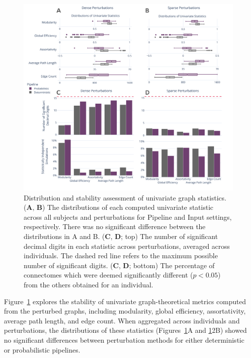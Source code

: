 \documentclass[fleqn,10pt]{SelfArx} %
\begin{document}
\begin{figure}[ht]\centering
\includegraphics[width=\linewidth]{figures/figS2_univariate_differences.pdf}
\caption{Distribution and stability assessment of univariate graph statistics. (\textbf{A}, \textbf{B}) The
distributions of each computed univariate statistic across all subjects and perturbations for Pipeline and Input
settings, respectively. There was no significant difference between the distributions in A and B. (\textbf{C},
\textbf{D}; top) The number of significant decimal digits in each statistic across perturbations, averaged across
individuals. The dashed red line refers to the maximum possible number of significant digits.
(\textbf{C}, \textbf{D}; bottom) The percentage of connectomes which were deemed significantly different
($p < 0.05$) from the others obtained for an individual.}
\label{sfig:univariate}
\end{figure}

Figure~\ref{sfig:univariate} explores the stability of univariate graph-theoretical metrics computed from the perturbed
graphs, including modularity, global efficiency, assortativity, average path length, and edge count. When aggregated
across individuals and perturbations, the distributions of these statistics (Figures~\ref{sfig:univariate}A and
\ref{sfig:univariate}2B) showed no significant differences between perturbation methods for either deterministic or
probabilistic pipelines.
\end{document}
